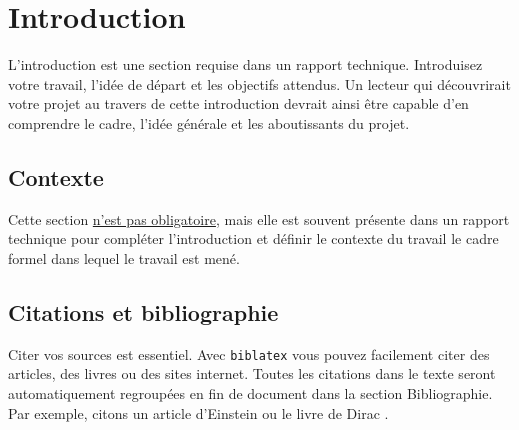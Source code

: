 \documentclass[
    iai, %
    eai, %
]{heig-tb}
\begin{document}
\maketitle
\frontmatter
\clearemptydoublepage

\preamble
\authentification

\begin{abstract}
    
\end{abstract}

\clearemptydoublepage
{
    \tableofcontents
    \let\cleardoublepage\clearpage
    \listoffigures
    \let\cleardoublepage\clearpage
    \listoftables
    \let\cleardoublepage\clearpage
    \listoflistings
}

\printnomenclature
\clearemptydoublepage
{}

\mainmatter
\chapter{Introduction}
L'introduction est une section requise dans un rapport technique. Introduisez votre travail, l'idée de départ et les objectifs attendus. Un lecteur qui découvrirait votre projet au travers de cette introduction devrait ainsi être capable d'en comprendre le cadre, l'idée générale et les aboutissants du projet.

\section{Contexte}
Cette section \underline{n'est pas obligatoire}, mais elle est souvent présente dans un rapport technique pour compléter l'introduction et définir le contexte du travail \cad le cadre formel dans lequel le travail est mené.

\section{Citations et bibliographie}
Citer vos sources est essentiel. Avec \texttt{biblatex} vous pouvez facilement citer des articles, des livres ou des sites internet. Toutes les citations dans le texte seront automatiquement regroupées en fin de document dans la section \guillemotleft Bibliographie\guillemotright. Par exemple, citons un article d'Einstein \cite{einstein} ou le livre de Dirac \cite{dirac}.
\end{document}
